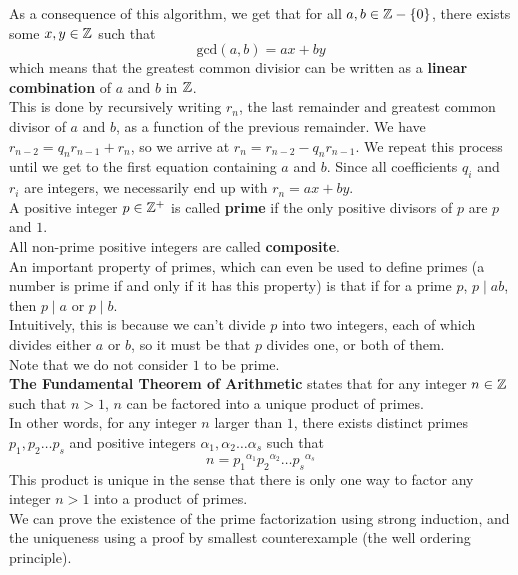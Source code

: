 \documentclass[12pt]{article}
\begin{document}
    As a consequence of this algorithm,
    we get that for all $a, b \in \mathbb{Z} - \{0\}$,
    there exists some $x, y \in \mathbb{Z}$ such that
    \[ \text{gcd}(a, b) = ax + by \] 
    which means that the greatest common divisior can be written
    as a \textbf{linear combination} of $a$ and $b$ in $\mathbb{Z}$. \\
    This is done by recursively writing $r_n$,
    the last remainder and greatest common divisor of $a$ and $b$,
    as a function of the previous remainder.
    We have $ r_{n-2} = q_{n}r_{n-1} + r_{n}$,
    so we arrive at $r_{n} = r_{n-2} - q_{n}r_{n-1}$.
    We repeat this process until we get to the first equation
    containing $a$ and $b$.
    Since all coefficients $q_i$ and $r_i$ are integers,
    we necessarily end up with $r_n = ax + by$. \\

    A positive integer $p \in \mathbb{Z}^+$ is called \textbf{prime}
    if the only positive divisors of $p$ are $p$ and $1$. \\
    All non-prime positive integers are called \textbf{composite}. \\
    An important property of primes,
    which can even be used to define primes
    (a number is prime if and only if it has this property)
    is that if for a prime $p$, $p \mid ab$,
    then $p \mid a$ or $p \mid b$. \\
    Intuitively, this is because we can't divide $p$
    into two integers, each of which divides either $a$ or $b$,
    so it must be that $p$ divides one, or both of them. \\
    Note that we do not consider $1$ to be prime. \\

    \textbf{The Fundamental Theorem of Arithmetic}
    states that for any integer $n \in \mathbb{Z}$ such that $n > 1$,
    $n$ can be factored into a unique product of primes. \\
    In other words, for any integer $n$ larger than $1$,
    there exists distinct primes $p_1, p_2 \dots p_s$
    and positive integers $\alpha_1, \alpha_2 \dots \alpha_s$
    such that
    \[ n = {p_1}^{\alpha_1}{p_2}^{\alpha_2} \dots {p_s}^{\alpha_s} \]
    This product is unique in the sense that there is only
    one way to factor any integer $n > 1$ into a product of primes. \\
    We can prove the existence of the prime factorization
    using strong induction,
    and the uniqueness using a proof by smallest counterexample
    (the well ordering principle). \\
\end{document}
